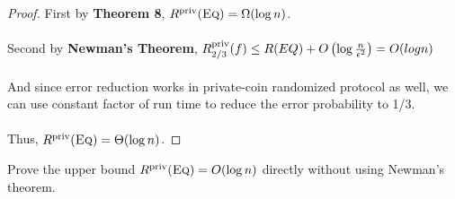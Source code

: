 \begin{proof}
	First by \textbf{Theorem 8}, $R^{\mathrm{priv}}(\textsc{Eq}) = \Omega( \log n)$.\\
	\\
	Second by \textbf{Newman's Theorem}, $R^{\mathrm{priv}}_{2/3}(f) \le R(EQ) + O\left(\log \frac{n}{\epsilon^2}\right) = O(logn)$\\
	\\
	And since error reduction works in private-coin randomized protocol as well, we can use constant factor of run time to reduce the error probability to 1/3.\\
	\\
	Thus, $R^{\mathrm{priv}}(\textsc{Eq}) = \Theta( \log n)$.
\end{proof}

\exercises

\begin{exercise}
	Prove the upper bound $R^{\mathrm{priv}}(\textsc{Eq}) = O( \log n)$ directly without using Newman's theorem.
\end{exercise}